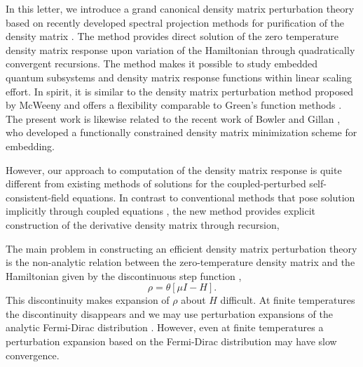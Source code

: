 In this letter, we introduce a grand canonical density matrix perturbation theory based
on recently developed spectral projection methods for purification of the density matrix
\cite{NiklassonSP2,NiklassonSP4}. The method provides direct solution of the zero temperature 
density matrix response upon variation of the Hamiltonian through quadratically convergent 
recursions. The method makes it possible to study embedded quantum subsystems 
and density matrix response functions within linear scaling effort.
In spirit, it is similar to the density matrix perturbation method
proposed by McWeeny \cite{McWeeny_PRT} and offers a flexibility comparable to
Green's function methods \cite{Inglesfield81,Turek}.
The present work is likewise related to the recent work of Bowler and Gillan \cite{Bowler02},
who developed a functionally constrained density matrix minimization scheme for embedding.

However, our approach to computation of the density matrix response is quite different from 
existing methods of solutions for the coupled-perturbed self-consistent-field equations.  
In contrast to conventional methods that pose solution implicitly through coupled equations 
\cite{Frisch,Dupuis,Ochsenfeld,Larsen}, the new method provides explicit construction of the 
derivative density matrix through recursion,  

The main problem in constructing an efficient
density matrix perturbation theory is the non-analytic
relation between the zero-temperature density matrix and 
the Hamiltonian given by the discontinuous step function \cite{Notation},
\begin{equation} \label{DM}
\rho = \theta[\mu I -  H].
\end{equation}
This discontinuity makes expansion of $\rho$ about $H$ difficult.
At finite temperatures the discontinuity disappears and we may use perturbation 
expansions of the analytic Fermi-Dirac distribution \cite{Feynman}. 
However, even at finite temperatures a perturbation expansion based
on the Fermi-Dirac distribution may have slow convergence.

